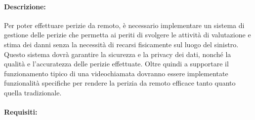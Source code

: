 \documentclass[a4paper,12pt, openright]{report}
\begin{document}
\paragraph{Descrizione:}
Per poter effettuare perizie da remoto, è necessario implementare un sistema di gestione delle perizie che permetta ai periti di svolgere le attività di valutazione e stima dei danni senza la necessità di recarsi fisicamente sul luogo del sinistro. Questo sistema dovrà garantire la sicurezza e la privacy dei dati, nonché la qualità e l'accuratezza delle perizie effettuate.
Oltre quindi a supportare il funzionamento tipico di una videochiamata dovranno essere implementate funzionalità specifiche per rendere la perizia da remoto efficace tanto quanto quella tradizionale.

\paragraph{Requisiti:}
\end{document}
